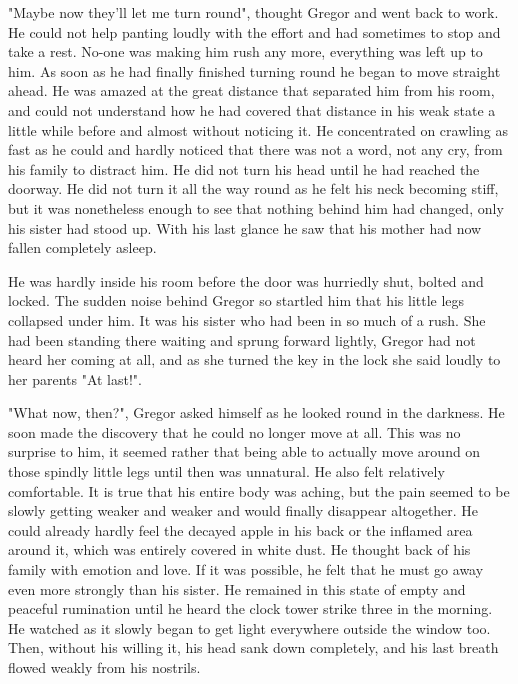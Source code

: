 "Maybe now they'll let me turn round", thought Gregor and went back to work. He could not help panting loudly with the effort and had sometimes to stop and take a rest. No-one was making him rush any more, everything was left up to him. As soon as he had finally finished turning round he began to move straight ahead. He was amazed at the great distance that separated him from his room, and could not understand how he had covered that distance in his weak state a little while before and almost without noticing it. He concentrated on crawling as fast as he could and hardly noticed that there was not a word, not any cry, from his family to distract him. He did not turn his head until he had reached the doorway. He did not turn it all the way round as he felt his neck becoming stiff, but it was nonetheless enough to see that nothing behind him had changed, only his sister had stood up. With his last glance he saw that his mother had now fallen completely asleep.

He was hardly inside his room before the door was hurriedly shut, bolted and locked. The sudden noise behind Gregor so startled him that his little legs collapsed under him. It was his sister who had been in so much of a rush. She had been standing there waiting and sprung forward lightly, Gregor had not heard her coming at all, and as she turned the key in the lock she said loudly to her parents "At last!".

"What now, then?", Gregor asked himself as he looked round in the darkness. He soon made the discovery that he could no longer move at all. This was no surprise to him, it seemed rather that being able to actually move around on those spindly little legs until then was unnatural. He also felt relatively comfortable. It is true that his entire body was aching, but the pain seemed to be slowly getting weaker and weaker and would finally disappear altogether. He could already hardly feel the decayed apple in his back or the inflamed area around it, which was entirely covered in white dust. He thought back of his family with emotion and love. If it was possible, he felt that he must go away even more strongly than his sister. He remained in this state of empty and peaceful rumination until he heard the clock tower strike three in the morning. He watched as it slowly began to get light everywhere outside the window too. Then, without his willing it, his head sank down completely, and his last breath flowed weakly from his nostrils.

